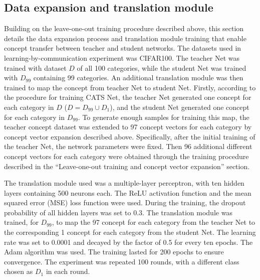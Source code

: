 \documentclass[pdflatex,sn-mathphys-num,lineno]{sn-jnl}%
\begin{document}
\begin{CJK}{UTF8}{gbsn}
\subsection{Data expansion and translation module}
Building on the leave-one-out training procedure described above, this section details the data expansion process and translation module training that enable concept transfer between teacher and student networks. The datasets used in learning-by-communication experiment was CIFAR100. The teacher Net was trained with dataset $D$ of all 100 categories, while the student Net was trained with $D_{99}$ containing 99 categories. An additional translation module was then trained to map the concept from teacher Net to student Net. Firstly, according to the procedure for training CATS Net, the teacher Net generated one concept for each category in $D$ ($D = D_{99} \cup D_1$), and the student Net generated one concept for each category in $D_{99}$. To generate enough samples for training this map, the teacher concept dataset was extended to 97 concept vectors for each category by concept vector expansion described above. Specifically, after the initial training of the teacher Net, the network parameters were fixed. Then 96 additional different concept vectors for each category were obtained through the training procedure described in the “Leave-one-out training and concept vector expansion” section. 

The translation module used was a multiple-layer perceptron, with ten hidden layers containing 500 neurons each. The ReLU activation function and the mean squared error (MSE) loss function were used. During the training, the dropout probability of all hidden layers was set to 0.3. The translation module was trained, for $D_{99}$, to map the 97 concept for each category from the teacher Net to the corresponding 1 concept for each category from the student Net. The learning rate was set to 0.0001 and decayed by the factor of 0.5 for every ten epochs. The Adam \cite{kingma_adam_2015} algorithm was used. The training lasted for 200 epochs to ensure convergence. The experiment was repeated 100 rounds, with a different class chosen as $D_1$ in each round.


\end{CJK}
\end{document}
